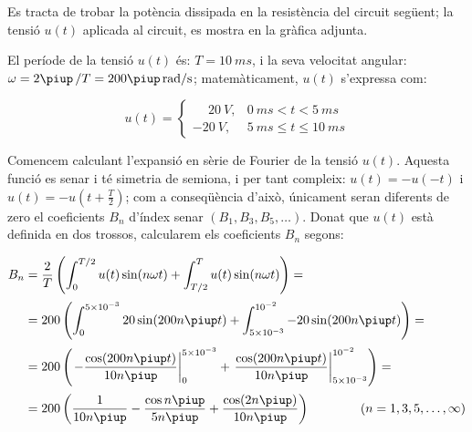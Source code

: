 \begin{exemple}\label{ex:fourier}
     Es tracta de trobar la potència
     dissipada en la resistència del circuit següent; la tensió $u(t)$ aplicada al circuit,
     es mostra en la gràfica adjunta.

    \begin{center}
        
    \end{center}

     El període de la tensió $u(t)$ és: $T=\SI{10}{ms}$, i la
    seva velocitat angular: $\omega = 2\piup\,/T = 200\piup\si{\,rad/s}$;
    matemàticament, $u(t)$ s'expressa com:

    \[
    u(t) = \begin{cases} \phantom{-}\SI{20}{V}, & \SI{0}{ms} < t < \SI{5}{ms} \\
           \SI{-20}{V}, & \SI{5}{ms} \leq t \leq \SI{10}{ms} \end{cases}
    \]

    Comencem calculant l'expansió en sèrie de Fourier de la tensió
    $u(t)$. Aquesta funció es senar i té simetria de semiona, i per tant
     compleix: $u(t)=-u(-t)$ i $u(t) = -u(t+\frac{T}{2})$; com a
    conseqüència d'això, únicament seran diferents de zero el
    coeficients $B_n$ d'índex senar $(B_1,B_3,B_5,\ldots)$. Donat que
    $u(t)$ està definida en dos trossos, calcularem els coeficients
    $B_n$ segons:

    \[
    \begin{split}
        B_n &= \frac{2}{T} \left( \int_0^{T/2} u(t) \sin(n \omega t) +
        \int_{T/2}^{T} u(t) \sin(n \omega t) \right) =\\[0.5ex]
        &= 200 \left( \int_0^{5\times 10^{-3}} 20 \sin(200 n \piup t) +
        \int_{5\times 10^{-3}}^{10^{-2}} -20 \sin(200 n \piup t) \right) =\\[0.5ex]
        &= 200 \left( \left. -\frac{\cos(200 n \piup t)}{10 n \piup}\right|_0^{5\times 10^{-3}}
        +  \left.\frac{\cos(200 n \piup t)}{10 n \piup}\right|_{5\times
        10^{-3}}^{10^{-2}}\right)=\\[0.5ex]
        &= 200\left( \frac{1}{10 n \piup} - \frac{\cos n \piup}{5 n \piup} +
        \frac{\cos (2 n \piup)}{10 n \piup}\right)
        \qquad\qquad(n=1,3,5,\ldots,\infty)
    \end{split}
    \]


\end{exemple}
